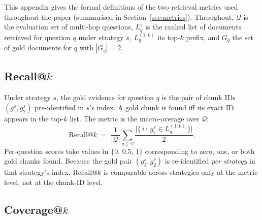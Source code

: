 
This appendix gives the formal definitions of the two retrieval
metrics used throughout the paper (summarised in
Section~\ref{sec:metrics}). Throughout, $\mathcal{Q}$ is the
evaluation set of multi-hop questions, $L_q^s$ is the ranked list of
documents retrieved for question $q$ under strategy $s$,
$L_q^{(1:k)}$ its top-$k$ prefix, and $G_q$ the set of gold documents
for $q$ with $|G_q|{=}2$.

\subsection{Recall@$k$}
\label{sec:appendix-metrics-recall}

Under strategy $s$, the gold evidence for question $q$ is the pair of
chunk IDs $(g_1^s, g_2^s)$ pre-identified in $s$'s index. A gold chunk
is found iff its exact ID appears in the top-$k$ list. The metric is
the macro-average over $\mathcal{Q}$:
\begin{equation}
\label{eq:recall}
\text{Recall@}k \;=\; \frac{1}{|\mathcal{Q}|}\sum_{q \in \mathcal{Q}}
\frac{\bigl|\{\,i \,:\, g_i^s \in L_q^{(1:k)}\,\}\bigr|}{2}.
\end{equation}
Per-question scores take values in $\{0,\, 0.5,\, 1\}$ corresponding
to zero, one, or both gold chunks found. Because the gold pair
$(g_1^s, g_2^s)$ is re-identified \emph{per strategy} in that
strategy's index, Recall@$k$ is comparable across strategies only at
the metric level, not at the chunk-ID level.

\subsection{Coverage@$k$}
\label{sec:appendix-metrics-coverage}

